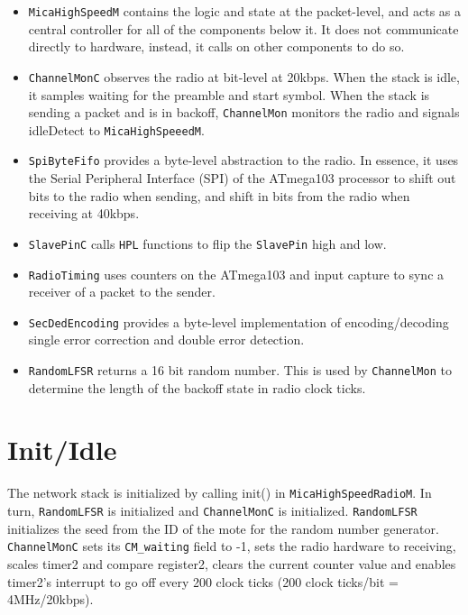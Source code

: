 \documentclass[11pt]{article}
\begin{document}
\begin{itemize}

\item {\tt MicaHighSpeedM} contains the logic and state at the
packet-level, and acts as a central controller for all of the
components below it. It does not communicate directly to hardware,
instead, it calls on other components to do so.

\item {\tt ChannelMonC} observes the radio at bit-level at 20kbps.  When the
stack is idle, it samples waiting for the preamble and start symbol.
When the stack is sending a packet and is in backoff, {\tt ChannelMon}
monitors the radio and signals idleDetect to {\tt MicaHighSpeeedM}.

\item {\tt SpiByteFifo} provides a byte-level abstraction to the radio.  In
essence, it uses the Serial Peripheral Interface (SPI) of the
ATmega103 processor to shift out bits to the radio when sending, and
shift in bits from the radio when receiving at 40kbps.  

\item {\tt SlavePinC} calls {\tt HPL} functions to flip the {\tt SlavePin} high and low.

\item {\tt RadioTiming} uses counters on the ATmega103 and input capture to sync a
receiver of a packet to the sender.

\item {\tt SecDedEncoding} provides a byte-level implementation of
encoding/decoding single error correction and double error detection.

\item {\tt RandomLFSR} returns a 16 bit random number. This is used by
{\tt ChannelMon} to determine the length of the backoff state in radio clock ticks.
\end{itemize}

\section*{Init/Idle}
The network stack is initialized by calling init() in
{\tt MicaHighSpeedRadioM}.  In turn, {\tt RandomLFSR} is initialized
and {\tt ChannelMonC}
is initialized.  {\tt RandomLFSR} initializes the seed from the ID of the mote
for the random number generator.  {\tt ChannelMonC} sets its {\tt CM\_waiting}
field to -1, sets the radio hardware to receiving, scales timer2 and
compare register2, clears the current counter value and enables
timer2's interrupt to go off every 200 clock ticks (200 clock
ticks/bit = 4MHz/20kbps).
\end{document}

